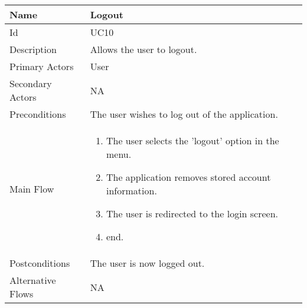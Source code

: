 \begin{tabularx}{\textwidth}{|l|X|}
\hline
Name              & Logout \\ \hline 
Id                & UC10 \\ \hline
Description       & Allows the user to logout. \\ \hline
Primary Actors    & User \\ \hline
Secondary Actors  & NA \\ \hline
Preconditions     & The user wishes to log out of the application. \\ \hline
Main Flow         &
{\footnotesize \begin{enumerate}
\item The user selects the 'logout’ option in the menu.
\item The application removes stored account information.
\item The user is redirected to the login screen.
\item end.
\end{enumerate}} \\ \hline
Postconditions    & The user is now logged out. \\ \hline
Alternative Flows & NA \\ \hline
\end{tabularx}